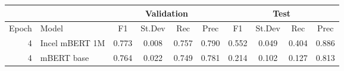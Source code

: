 \begin{tabular}{rl|cccc|cccc}
    \hline
                  &                    &  \multicolumn{4}{c|}{Validation}              & \multicolumn{4}{c}{Test} \\
    \hline
            Epoch &              Model &      F1 &      St.Dev &   Rec & Prec &       F1 &       St.Dev &  Rec   &  Prec \\
    \hline
  4 & Incel mBERT 1M &   0.773 &          0.008 &    0.757 &     0.790 &    0.552 &           0.049 &     0.404 &      0.886 \\
  4 &           mBERT base &   0.764 &          0.022 &    0.749 &     0.781 &    0.214 &           0.102 &     0.127 &      0.813 \\
\hline
\end{tabular}
